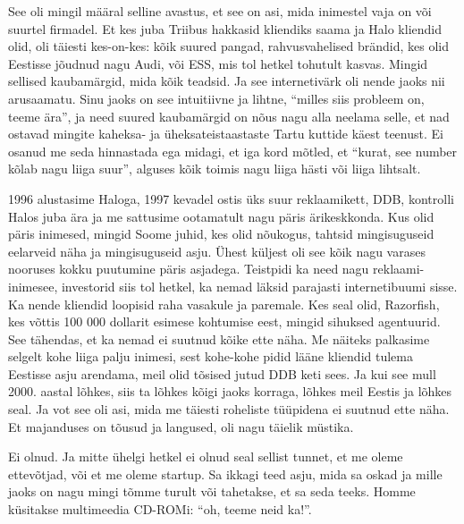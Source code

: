 See oli mingil määral selline avastus, et see on asi, mida inimestel vaja on või  suurtel firmadel. Et kes juba Triibus hakkasid kliendiks saama ja Halo  kliendid olid, oli täiesti kes-on-kes: kõik suured pangad,  rahvusvahelised brändid, kes olid Eestisse jõudnud nagu Audi, või ESS, mis tol hetkel tohutult kasvas. Mingid sellised kaubamärgid, mida kõik teadsid. Ja see internetivärk oli nende jaoks nii arusaamatu. Sinu jaoks on see intuitiivne ja lihtne, \enquote{milles siis probleem on, teeme ära}, ja need suured kaubamärgid on  nõus nagu alla neelama selle, et nad ostavad mingite kaheksa- ja üheksateistaastaste Tartu kuttide käest teenust. Ei osanud me seda hinnastada ega midagi, et iga kord mõtled, et \enquote{kurat, see number kõlab nagu liiga suur},  alguses kõik toimis nagu liiga hästi või liiga lihtsalt. 

1996 alustasime Haloga, 1997 kevadel ostis üks suur reklaamikett, DDB, kontrolli Halos juba ära ja  me sattusime ootamatult nagu päris ärikeskkonda. Kus olid päris inimesed, mingid Soome juhid, kes olid nõukogus, tahtsid mingisuguseid eelarveid näha ja mingisuguseid asju. Ühest küljest oli see kõik nagu varases nooruses  kokku puutumine päris asjadega.  Teistpidi ka need nagu reklaami-inimesee,  investorid siis tol hetkel, ka nemad läksid parajasti internetibuumi sisse. Ka nende kliendid loopisid raha vasakule ja paremale.  Kes seal olid, Razorfish, kes võttis  100 000 dollarit esimese kohtumise eest, mingid sihuksed agentuurid. See tähendas, et ka nemad ei suutnud kõike ette näha. Me näiteks palkasime selgelt kohe liiga palju inimesi, sest kohe-kohe pidid  lääne kliendid tulema Eestisse asju arendama, meil olid tõsised jutud DDB keti sees. Ja kui see mull  2000. aastal lõhkes, siis ta lõhkes kõigi jaoks korraga, lõhkes meil Eestis ja lõhkes seal. Ja vot see oli asi, mida me  täiesti roheliste tüüpidena ei suutnud ette näha. Et majanduses  on tõusud ja langused, oli nagu täielik müstika. 


Ei olnud. Ja mitte ühelgi hetkel ei olnud seal sellist tunnet, et me oleme ettevõtjad, või et me oleme startup. Sa ikkagi teed asju, mida sa oskad ja mille jaoks on nagu mingi tõmme turult või tahetakse, et sa seda teeks. Homme küsitakse multimeedia CD-ROMi: \enquote{oh, teeme neid ka!}. 

